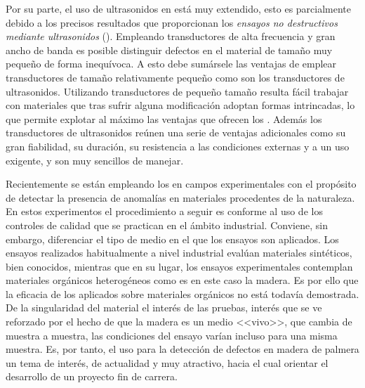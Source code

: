Por su parte, el uso de ultrasonidos en  está muy extendido, esto
es parcialmente debido a los precisos resultados que proporcionan los
\emph{ensayos no destructivos mediante ultrasonidos} ().
Empleando transductores de alta frecuencia y gran ancho de banda es posible
distinguir defectos en el material de tamaño muy pequeño de forma
inequívoca. A esto debe sumársele las ventajas de emplear transductores de
tamaño relativamente pequeño como son los transductores de ultrasonidos.
Utilizando transductores de pequeño tamaño resulta fácil trabajar con
materiales que tras sufrir alguna modificación adoptan formas intrincadas,
lo que permite explotar al máximo las ventajas que ofrecen los .
Además los transductores de ultrasonidos reúnen una serie de ventajas
adicionales como su gran fiabilidad, su duración, su resistencia a las
condiciones externas y a un uso exigente, y son muy sencillos de
manejar.

Recientemente se están empleando los  en campos experimentales
con el propósito de detectar la presencia de anomalías en materiales
procedentes de la naturaleza. En estos experimentos el procedimiento a
seguir es conforme al uso de los controles de calidad que se practican en
el ámbito industrial. Conviene, sin embargo, diferenciar el tipo de medio
en el que los ensayos son aplicados. Los ensayos realizados habitualmente a
nivel industrial evalúan materiales sintéticos, bien conocidos, mientras
que en su lugar, los ensayos experimentales contemplan materiales orgánicos
heterogéneos como es en este caso la madera. Es por ello que la eficacia de
los  aplicados sobre materiales orgánicos no está todavía
demostrada. De la singularidad del material el interés de las pruebas,
interés que se ve reforzado por el hecho de que la madera es un medio
<<vivo>>, que cambia de muestra a muestra, las condiciones del ensayo
varían incluso para una misma muestra. Es, por tanto, el uso 
para la detección de defectos en madera de palmera un tema de interés, de
actualidad y muy atractivo, hacia el cual orientar el desarrollo de un
proyecto fin de carrera.

\prosec{}


